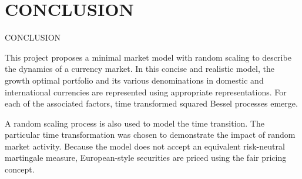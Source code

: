 \documentclass[unknownkeysallowed, compress]{beamer}
\theoremstyle{plain}
\begin{document}
\section{CONCLUSION}
\begin{frame}[allowframebreaks]{CONCLUSION}
\noindent
\par %
\par This project proposes a minimal market model with random scaling to describe the dynamics of a currency market. In this concise and realistic model, the growth optimal portfolio and its various denominations in domestic and international currencies are represented using appropriate representations. For each of the associated factors, time transformed squared Bessel processes emerge.\\
\par A random scaling process is also used to model the time transition. The particular time transformation was chosen to demonstrate the impact of random market activity. Because the model does not accept an equivalent risk-neutral martingale measure, European-style securities are priced using the fair pricing concept.



\end{frame}
\end{document}
